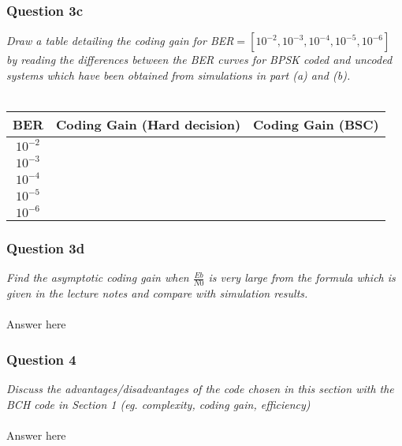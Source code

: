 \documentclass[a4paper]{article}
\begin{document}
\subsubsection*{Question 3c} \textit{Draw a table detailing the coding gain for BER$= [10^{−2}, 10^{−3}, 10^{−4} , 10^{−5} , 10^{−6} ]$ by reading the differences between the BER curves for BPSK coded and uncoded systems which have been obtained from simulations in part (a) and (b).}\\
\\
\begin{tabular}{| c | c | c |}
\hline
BER & Coding Gain (Hard decision) & Coding Gain (BSC) \\
\hline
$10^{-2}$ & & \\
\hline
$10^{-3}$ & & \\
\hline
$10^{-4}$ & & \\
\hline
$10^{-5}$ & & \\
\hline
$10^{-6}$ & & \\
\hline
\end{tabular}

\subsubsection*{Question 3d} \textit{Find the asymptotic coding gain when $\frac{Eb}{N0}$ is very large from the formula which is given in the lecture notes and compare with simulation results.} \\
\\
Answer here \\

\subsubsection*{Question 4} \textit{Discuss the advantages/disadvantages of the code chosen in this section with the BCH code in Section 1 (eg. complexity, coding gain, efficiency)}\\
\\
Answer here \\
\end{document}
